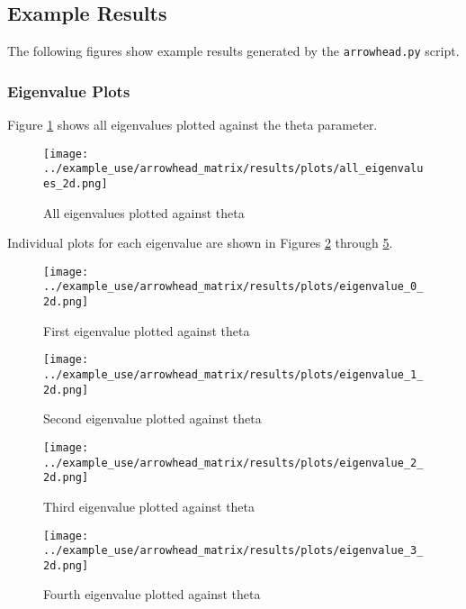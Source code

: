 \subsection{Example Results}

The following figures show example results generated by the \texttt{arrowhead.py} script.

\subsubsection{Eigenvalue Plots}

Figure \ref{fig:all_eigenvalues_2d_gen} shows all eigenvalues plotted against the theta parameter.

\begin{figure}[H]
    \centering
    \texttt{[image: ../example\_use/arrowhead\_matrix/results/plots/all\_eigenvalues\_2d.png]}
    \caption{All eigenvalues plotted against theta}
    \label{fig:all_eigenvalues_2d_gen}
\end{figure}

Individual plots for each eigenvalue are shown in Figures \ref{fig:eigenvalue_0_2d_gen} through \ref{fig:eigenvalue_3_2d_gen}.

\begin{figure}[H]
    \centering
    \texttt{[image: ../example\_use/arrowhead\_matrix/results/plots/eigenvalue\_0\_2d.png]}
    \caption{First eigenvalue plotted against theta}
    \label{fig:eigenvalue_0_2d_gen}
\end{figure}

\begin{figure}[H]
    \centering
    \texttt{[image: ../example\_use/arrowhead\_matrix/results/plots/eigenvalue\_1\_2d.png]}
    \caption{Second eigenvalue plotted against theta}
    \label{fig:eigenvalue_1_2d_gen}
\end{figure}

\begin{figure}[H]
    \centering
    \texttt{[image: ../example\_use/arrowhead\_matrix/results/plots/eigenvalue\_2\_2d.png]}
    \caption{Third eigenvalue plotted against theta}
    \label{fig:eigenvalue_2_2d_gen}
\end{figure}

\begin{figure}[H]
    \centering
    \texttt{[image: ../example\_use/arrowhead\_matrix/results/plots/eigenvalue\_3\_2d.png]}
    \caption{Fourth eigenvalue plotted against theta}
    \label{fig:eigenvalue_3_2d_gen}
\end{figure}

